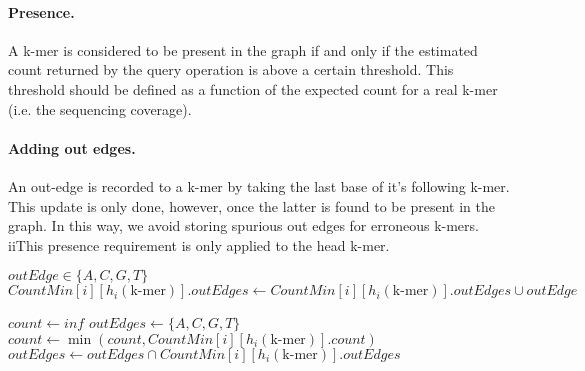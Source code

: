 \paragraph{Presence.} A k-mer is considered to be present in the graph if and only if the estimated count returned by the query operation
is above a certain threshold. This threshold should be defined as a function of the expected count for a real k-mer (i.e. the sequencing coverage).

\paragraph{Adding out edges.} An out-edge is recorded to a k-mer by taking the last base of it's following k-mer. This update is only done,
however, once the latter is found to be present in the graph. In this way, we avoid storing spurious out edges for erroneous k-mers.
iiThis presence requirement is only applied to the head k-mer.

\begin{algorithm}
    \caption{$\mathit{addOutEdge}(\text{k-mer}, \mathit{outEdge})$}\label{alg:addOutEdge}
    \begin{algorithmic}
        \Ensure $\mathit{outEdge} \in \{A, C, G, T\}$
            \State $\mathit{CountMin}[i][h_i(\text{k-mer})].\mathit{outEdges} \gets \mathit{CountMin}[i][h_i(\text{k-mer})].\mathit{outEdges} \cup \mathit{outEdge}$
        \EndFor
    \end{algorithmic}
\end{algorithm}

\begin{algorithm}
    \caption{$\mathit{query}(\text{k-mer})$}\label{alg:query}
    \begin{algorithmic}
        \State $\mathit{count} \gets \mathit{inf}$
        \State $\mathit{outEdges} \gets \{A, C, G, T\}$
            \State $\mathit{count} \gets \min(\mathit{count}, \mathit{CountMin}[i][h_i(\text{k-mer})].\mathit{count})$
            \State $\mathit{outEdges} \gets \mathit{outEdges} \cap \mathit{CountMin}[i][h_i(\text{k-mer})].\mathit{outEdges}$
        \EndFor
    \end{algorithmic}
\end{algorithm}
